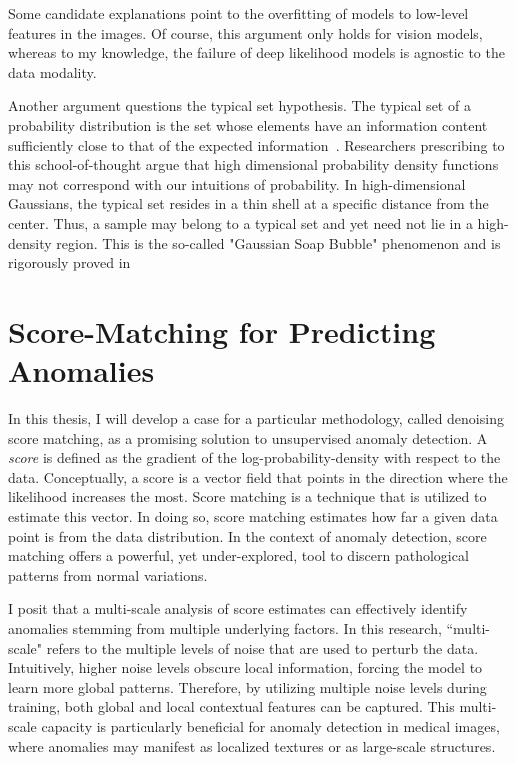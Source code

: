 Some candidate explanations point to the overfitting of models to low-level features in the images. Of course, this argument only holds for vision models, whereas to my knowledge, the failure of deep likelihood models is agnostic to the data modality.

Another argument questions the typical set hypothesis.
The typical set of a probability distribution is the set whose elements have an information content sufficiently close to that of the expected information~\cite{shannon_1948}.
Researchers prescribing to this school-of-thought argue that high dimensional probability density functions may not correspond with our intuitions of probability. In high-dimensional Gaussians, the typical set resides in a thin shell at a specific distance from the center. Thus, a sample may belong to a typical set and yet need not lie in a high-density region. This is the so-called "Gaussian Soap Bubble" phenomenon and is rigorously proved in \cite{vershynin2018high}


\section{Score-Matching for Predicting Anomalies}

In this thesis, I will develop a case for a particular methodology, called denoising score matching, as a promising solution to unsupervised anomaly detection. A \textit{score} is defined as the gradient of the log-probability-density with respect to the data. Conceptually, a score is a vector field that points in the direction where the likelihood increases the most. Score matching is a technique that is utilized to estimate this vector. In doing so, score matching estimates how far a given data point is from the data distribution. In the context of anomaly detection, score matching offers a powerful, yet under-explored, tool to discern pathological patterns from normal variations.

I posit that a multi-scale analysis of score estimates can effectively identify anomalies stemming from multiple underlying factors. In this research, ``multi-scale" refers to the multiple levels of noise that are used to perturb the data. Intuitively, higher noise levels obscure local information, forcing the model to learn more global patterns. Therefore, by utilizing multiple noise levels during training, both global and local contextual features can be captured. This multi-scale capacity is particularly beneficial for anomaly detection in medical images, where anomalies may manifest as localized textures or as large-scale structures.


